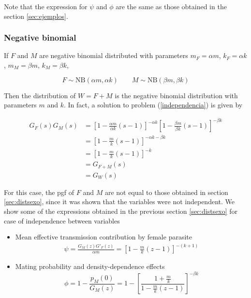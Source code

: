 \documentclass[12pt,a4paper]{article}
\theoremstyle{plain}%
\theoremstyle{definition}
\theoremstyle{remark}
\begin{document}
	Note that the expression for $\psi$ and $\phi$ are the same as those obtained in the section \ref{sec:ejemplos}.
	
	\subsubsection{Negative binomial}
	
	If $F$ and $M$ are negative binomial distributed with parameters $m_F=\alpha m$, $k_F=\alpha k$, $m_M=\beta m$, $k_M=\beta k$, 
	
	\begin{equation*}
	F\sim \mathrm{NB}(\alpha m,\alpha k) \qquad M\sim \mathrm{NB}(\beta m,\beta k)
	\end{equation*}  
	
	Then the distribution of $W=F+M$ is the negative binomial distribution with parameters $m$ and $k$. In fact,  a solution to problem (\ref{independencia}) is given by
	 
	\begin{align*}
	G_F(s)G_M(s)&=\left[ 1-\frac{\alpha m}{\alpha k}(s-1)\right] ^{-\alpha k} \left[ 1-\frac{\beta m}{\beta k}(s-1)\right] ^{-\beta k}\\
	&=\left[ 1-\frac{m}{k}(s-1)\right] ^{-\alpha k-\beta k}\\
	&=\left[ 1- \frac{m}{k}(s-1) \right] ^{-k}\\
	&=G_{F+M}(s)\\
	&=G_W(s)
	\end{align*}

For this case, the pgf of $F$ and $M$ are not equal to those obtained in section \ref{sec:distsexo}, since it was shown that the variables were not independent. We show some of the expressions obtained in the previous section \ref{sec:distsexo} for case of independence between variables 
	
	\begin{itemize}
		\item Mean effective transmission contribution by female parasite
		\begin{align}
		\psi=\frac{G_M(z)G'_F(z)}{\alpha m}=\left[ 1-\frac{m}{k}(z-1)\right] ^{-(k+1)}
		\end{align}
		
		\item Mating probability and density-dependence effects
		\begin{equation}
		\phi= 1-\frac{p_M(0)}{G_M(z)}=1-\left[ \frac{1+\frac{m}{k}}{1-\frac{m}{k}(z-1)}\right]^{-\beta k} 
		\end{equation}
	\end{itemize}
\end{document}
